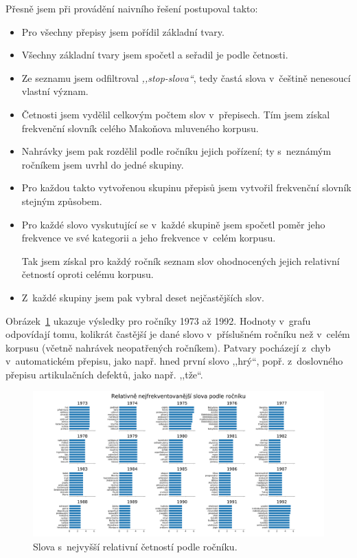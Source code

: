 Přesně jsem při provádění naivního řešení postupoval takto:
\begin{itemize}
\item{%
Pro všechny přepisy jsem pořídil základní tvary.
}
\item{%
Všechny základní tvary jsem spočetl a seřadil je podle četnosti.
}
\item{%
Ze seznamu jsem odfiltroval \textit{,,stop-slova``}, tedy častá slova v~češtině
nenesoucí vlastní význam.
}
\item{%
Četnosti jsem vydělil celkovým počtem slov v~přepisech. Tím jsem získal
frekvenční slovník celého Makoňova mluveného korpusu.
}
\item{%
Nahrávky jsem pak rozdělil podle ročníku jejich pořízení; ty s~neznámým ročníkem
jsem uvrhl do jedné skupiny.
}
\item{%
Pro každou takto vytvořenou skupinu přepisů jsem vytvořil frekvenční slovník
stejným způsobem.
}
\item{%
Pro každé slovo vyskutující se v~každé skupině jsem spočetl poměr jeho frekvence
ve své kategorii a jeho frekvence v~celém korpusu.

Tak jsem získal pro každý ročník seznam slov ohodnocených jejich relativní
četností oproti celému korpusu.
}
\item{%
Z~každé skupiny jsem pak vybral deset nejčastějších slov.
}
\end{itemize}

Obrázek~\ref{fig:topic-by-year-relfreq} ukazuje výsledky pro ročníky 1973 až 1992.
Hodnoty v~grafu odpovídají tomu, kolikrát častější je dané slovo v~příslušném
ročníku než v~celém korpusu (včetně nahrávek neopatřených ročníkem). Patvary
pocházejí z~chyb v~automatickém přepisu, jako např. hned první slovo ,,hrý``, popř.
z~doslovného přepisu artikulačních defektů, jako např. ,,tže``.

\begin{figure}[htpb]
\includegraphics[scale=0.32, angle=90]{rc/topics-by-year-relfreq.pdf}
\caption{%
  Slova s~nejvyšší relativní četností podle ročníku.
}
\label{fig:topic-by-year-relfreq}
\end{figure}

